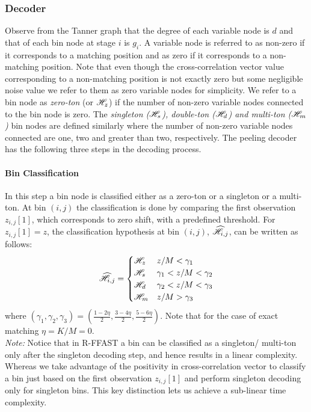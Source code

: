 \subsubsection{Decoder}			
	Observe from the Tanner graph that the degree of each variable node is $d$ and that of each bin node at stage $i$ is $g_i$. A variable node is referred to as non-zero if it corresponds to a matching position and as zero if it corresponds to a non-matching position. Note that even though the cross-correlation vector value corresponding to a non-matching position is not exactly zero but some negligible noise value we refer to them as zero variable nodes for simplicity. We refer to a bin node as {\it zero-ton} (or $\mathscr{H}_z$) if the number of non-zero variable nodes connected to the bin node is zero. The {\it singleton ($\mathscr{H}_s$), double-ton ($\mathscr{H}_d$) and multi-ton ($\mathscr{H}_m$)} bin nodes are defined similarly where the number of non-zero variable nodes connected are one, two and greater than two, respectively. The peeling decoder has the following three steps in the decoding process.

\paragraph*{Bin Classification} In this step a bin node is classified either as a zero-ton or a singleton or a multi-ton. At bin $(i,j)$ the classification is done by  comparing the first observation $z_{i,j}[1]$, which corresponds to zero shift, with a predefined threshold. For $z_{i,j}[1]=z$, the classification hypothesis at bin $(i,j)$, $\widehat{\mathscr{H}}_{i,j}$, can be written as follows:
\begin{align}
\label{Eqn:BinClassifApprox}
\widehat{\mathscr{H}}_{i,j}=
\begin{cases}
\mathscr{H}_z &  	 z/M < \gamma_1\\
\mathscr{H}_s &	  \gamma_1 < z/M < \gamma_2  \\
\mathscr{H}_d  &    \gamma_2  < z/M <  \gamma_3\\
\mathscr{H}_m &      z/M > \gamma_3\\
\end{cases}
\end{align}
where $(\gamma_1,\gamma_2,\gamma_3)=(\frac{1-2\eta}{2},\frac{3-4\eta}{2},\frac{5-6\eta}{2})$. Note that for the case of exact matching $\eta=K/M=0$.\\
  \textit{Note:} Notice that in R-FFAST \cite{pawar2014robust} a bin can be classified as a singleton/ multi-ton only after the singleton decoding step, and hence results in a linear complexity. Whereas we take advantage of the positivity in cross-correlation vector to classify a bin just based on the first observation $z_{i,j}[1]$ and perform singleton decoding only for singleton bins. This key distinction lets us achieve a sub-linear time complexity.
